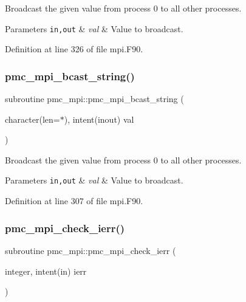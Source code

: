 Broadcast the given value from process 0 to all other processes. 


\begin{DoxyParams}[1]{Parameters}
\mbox{\tt in,out}  & {\em val} & Value to broadcast. \\
\hline
\end{DoxyParams}


Definition at line 326 of file mpi.\+F90.

\mbox{\label{namespacepmc__mpi_a4cd3eb742c928a5f4f796dd8d76263cc}} 
\subsubsection{\texorpdfstring{pmc\+\_\+mpi\+\_\+bcast\+\_\+string()}{pmc\_mpi\_bcast\_string()}}
{\footnotesize\ttfamily subroutine pmc\+\_\+mpi\+::pmc\+\_\+mpi\+\_\+bcast\+\_\+string (\begin{DoxyParamCaption}\item[{character(len=$\ast$), intent(inout)}]{val }\end{DoxyParamCaption})}



Broadcast the given value from process 0 to all other processes. 


\begin{DoxyParams}[1]{Parameters}
\mbox{\tt in,out}  & {\em val} & Value to broadcast. \\
\hline
\end{DoxyParams}


Definition at line 307 of file mpi.\+F90.

\mbox{\label{namespacepmc__mpi_af7b0af100baf65538aecee298e321e0c}} 
\subsubsection{\texorpdfstring{pmc\+\_\+mpi\+\_\+check\+\_\+ierr()}{pmc\_mpi\_check\_ierr()}}
{\footnotesize\ttfamily subroutine pmc\+\_\+mpi\+::pmc\+\_\+mpi\+\_\+check\+\_\+ierr (\begin{DoxyParamCaption}\item[{integer, intent(in)}]{ierr }\end{DoxyParamCaption})}



